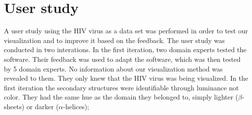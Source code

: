 \documentclass[review,journal]{vgtc}         %
\begin{document}
%
%

\section{User study}
A user study using the HIV virus as a data set was performed in order to test our visualization and to improve it based on the feedback.
The user study was conducted in two interations. 
In the first iteration, two domain experts tested the software. 
Their feedback was used to adapt the software, which was then tested by 5 domain experts.
No information about our visualization method was revealed to them. They only knew that the HIV virus was being visualized.
In the first iteration the secondary structures were identifiable through luminance not color. They had the same hue as the domain they belonged to, simply lighter ($\beta$-sheets) or darker ($\alpha$-helices);
\end{document}
